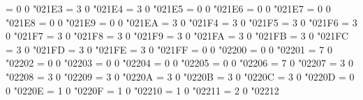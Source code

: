 \Umathchardef\downdasharrow = 0 0 "021E3 %
\Umathchardef\barleftarrow = 3 0 "021E4 %
\Umathchardef\rightarrowbar = 3 0 "021E5 %
\Umathchardef\leftwhitearrow = 0 0 "021E6 %
\Umathchardef\upwhitearrow = 0 0 "021E7 %
\Umathchardef\rightwhitearrow = 0 0 "021E8 %
\Umathchardef\downwhitearrow = 0 0 "021E9 %
\Umathchardef\whitearrowupfrombar = 0 0 "021EA %
\Umathchardef\circleonrightarrow = 3 0 "021F4 %
\Umathchardef\downuparrows = 3 0 "021F5 %
\Umathchardef\rightthreearrows = 3 0 "021F6 %
\Umathchardef\nvleftarrow = 3 0 "021F7 %
\Umathchardef\nvrightarrow = 3 0 "021F8 %
\Umathchardef\nvleftrightarrow = 3 0 "021F9 %
\Umathchardef\nVleftarrow = 3 0 "021FA %
\Umathchardef\nVrightarrow = 3 0 "021FB %
\Umathchardef\nVleftrightarrow = 3 0 "021FC %
\Umathchardef\leftarrowtriangle = 3 0 "021FD %
\Umathchardef\rightarrowtriangle = 3 0 "021FE %
\Umathchardef\leftrightarrowtriangle = 3 0 "021FF %
\Umathchardef\forall = 0 0 "02200 %
\Umathchardef\complement = 0 0 "02201 %
\Umathchardef\partial = 7 0 "02202 %
\Umathchardef\exists = 0 0 "02203 %
\Umathchardef\nexists = 0 0 "02204 %
\Umathchardef\varnothing = 0 0 "02205 %
\Umathchardef\increment = 0 0 "02206 %
\Umathchardef\nabla = 7 0 "02207 %
\Umathchardef\in = 3 0 "02208 %
\Umathchardef\notin = 3 0 "02209 %
\Umathchardef\smallin = 3 0 "0220A %
\Umathchardef\ni = 3 0 "0220B %
\Umathchardef\nni = 3 0 "0220C %
\Umathchardef\smallni = 3 0 "0220D %
\Umathchardef\QED = 0 0 "0220E %
\Umathchardef\prod = 1 0 "0220F %
\Umathchardef\coprod = 1 0 "02210 %
\Umathchardef\sum = 1 0 "02211 %
\Umathchardef\minus = 2 0 "02212 %
